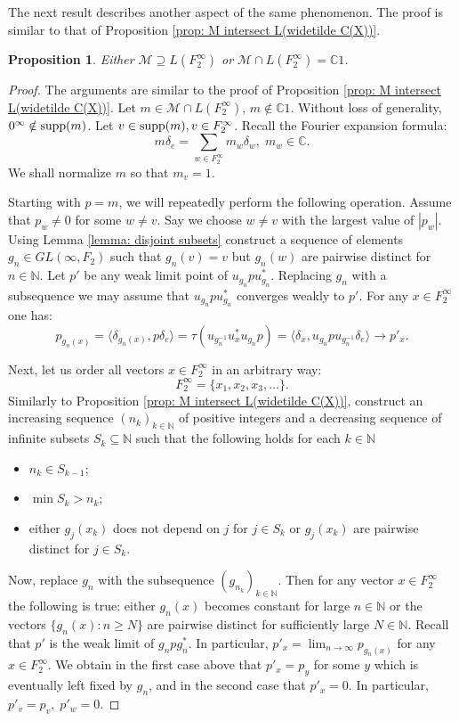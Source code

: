 \documentclass[11pt]{amsart}
\newcommand{\N}{\mathbb N}
\newcommand{\suppe}{{\rm supp}}
\theoremstyle{plain}
\newtheorem{proposition}[theorem]{Proposition}
\theoremstyle{definition}
\theoremstyle{remark}
\numberwithin{equation}{section}
\begin{document}
The next result describes another aspect of the same phenomenon. The proof is similar to that of Proposition \ref{prop: M intersect L(widetilde C(X))}.
\begin{proposition}\label{prop: M and L(Z2infty)}
	Either $\mathcal M\supseteq L(F_2^\infty)$ or $\mathcal M\cap L(F_2^\infty)=\mathbb C1$.
\end{proposition}
\begin{proof}
The arguments are similar to the proof of Proposition \ref{prop: M intersect L(widetilde C(X))}. Let $m\in\mathcal M\cap  L(F_2^\infty)$, $m\notin\mathbb C1$. Without loss of generality, $0^\infty\notin\suppe(m)$. Let $v\in\suppe(m), v\in F_2^\infty$.  Recall the Fourier expansion formula: 
$$m\delta_e=\sum\limits_{w\in F_2^\infty} m_w \delta_w,\;m_w\in\mathbb C.$$ 
We shall normalize $m$ so that $m_v=1$. 
	
Starting with $p=m$, we will repeatedly perform the following operation. Assume that $p_w\neq 0$ for some $w\neq v$. Say we choose $w\neq v$ with the largest value of $|p_w|$. Using Lemma \ref{lemma: disjoint subsets}
construct a sequence of elements $g_n\in GL(\infty,F_2)$ such that $g_n(v)=v$ but $g_n(w)$ are pairwise distinct for $n\in\mathbb N$. Let $p'$ be any weak limit point of $u_{g_n}pu_{g_n}^*$. Replacing $g_n$ with a subsequence we may assume that $u_{g_n}pu_{g_n}^*$ converges weakly to $p'$. For any $x\in F_2^\infty$ one has:
$$ p_{g_n(x)} = \langle \delta_{g_n(x)},p\delta_e\rangle = \tau(u_{g_n^{-1}} u_{x}^* u_{g_n}p) = \langle \delta_x,u_{g_n}pu_{g_n^{-1}}\delta_e \rangle\longrightarrow p'_x.$$ 
	
Next, let us order all vectors $x\in F_2^\infty$ in an arbitrary way: $$F_2^\infty=\{x_1,x_2,x_3,\ldots\}.$$ Similarly to Proposition \ref{prop: M intersect L(widetilde C(X))}, construct an increasing sequence $(n_k)_{k \in \N}$ of positive integers and a decreasing sequence of infinite subsets $S_k\subseteq\mathbb N$ such that the following holds for each $k\in \N$ 
	\begin{itemize}
		\item[$1)$] $n_k\in S_{k-1}$;
		\item[$2)$] $\min S_k>n_k$;
		\item[$3)$] either $g_j(x_k)$ does not depend on $j$ for $j\in S_k$ or $g_j(x_k)$ are pairwise distinct for $j\in S_k$.
	\end{itemize} 
Now, replace $g_n$ with the  subsequence $(g_{n_k})_{k \in \N}$. Then for any vector $x\in F_2^\infty$ the following is true: either  $g_n(x)$ becomes constant for large $n\in \N$ or  the vectors $\{g_n(x):n\geqslant N\}$ are pairwise distinct for sufficiently large $N\in \N$. Recall that $p'$ is the weak limit of $g_npg_n^*$. In particular, $p'_x=\lim_{n \to \infty} p_{g_n(x)}$ for any $x\in F_2^\infty$. We obtain in the first case above
that $p'_x=p_y$ for some $y$ which is eventually left fixed by $g_n$, and in the second case that $p'_x=0$. In particular, $p'_v=p_v,\;p'_w=0$.
	

\end{proof}
\end{document}

